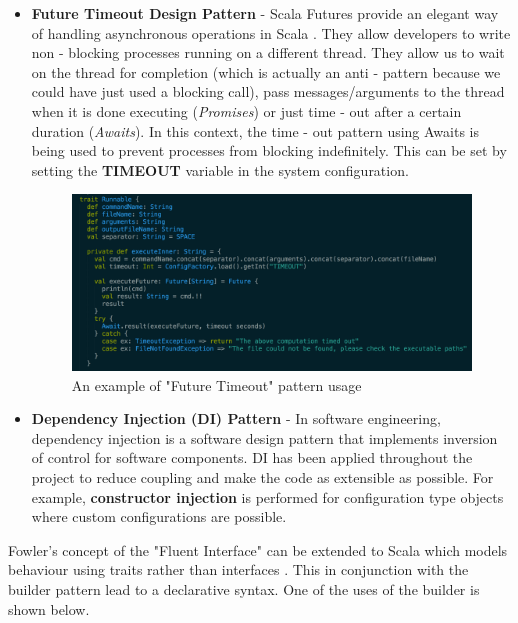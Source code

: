 \documentclass[12pt]{article}
\begin{document}
\begin{itemize}
\item \textbf{Future Timeout Design Pattern} - Scala Futures provide an elegant way of handling asynchronous operations in Scala \cite{scala}. They allow developers to write non - blocking processes running on a different thread. They allow us to wait on the thread for completion (which is actually an anti - pattern because we could have just used a blocking call), pass messages/arguments to the thread when it is done executing (\textit{Promises}) or just time - out after a certain duration (\textit{Awaits}). In this context, the time - out pattern using Awaits is being used to prevent processes from blocking indefinitely. This can be set by setting the \textbf{TIMEOUT} variable in the system configuration.
\begin{figure}[H]
  \centering
    \includegraphics[width=500px]{figures/futures.png}
  \caption{An example of "Future Timeout" pattern usage}
\end{figure}
\item \textbf{Dependency Injection (DI) Pattern} - In software engineering, dependency injection is a software design pattern that implements inversion of control for software components. DI has been applied throughout the project to reduce coupling and make the code as extensible as possible. For example, \textbf{constructor injection} is performed for configuration type objects where custom configurations are possible.
\end{itemize}

\noindent
Fowler's concept of the "Fluent Interface" can be extended to Scala which models behaviour using traits rather than interfaces \cite{scala}. This in conjunction with the builder pattern lead to a declarative syntax. One of the uses of the builder is shown below.
\end{document}
